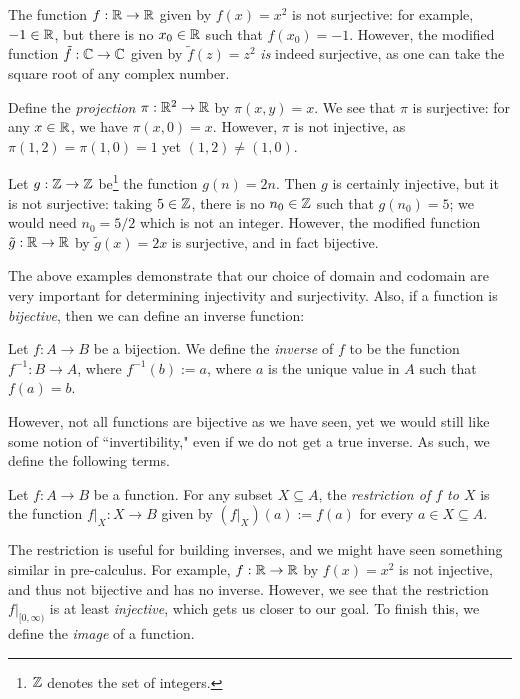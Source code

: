 \documentclass{article}
\begin{document}
\begin{example}
The function $f: \mathbb R\to \mathbb R$ given by $f(x) = x^2$ is not surjective: for example, $-1\in \mathbb R$, but there is no $x_0\in \mathbb R$ such that $f(x_0) = -1$. However, the modified function $\tilde f: \mathbb C\to \mathbb C$ given by $\tilde f(z) = z^2$ \textit{is} indeed surjective, as one can take the square root of any complex number.
\end{example}
\begin{example}
Define the \textit{projection} $\pi: \mathbb R^2\to \mathbb R$ by $\pi (x,y) = x$. We see that $\pi$ is surjective: for any $x\in \mathbb R$, we have $\pi(x, 0) = x$. However, $\pi$ is not injective, as $\pi(1, 2) = \pi(1, 0) = 1$ yet $(1,2) \neq (1,0)$.
\end{example}
\begin{example}
Let $g: \mathbb Z\to \mathbb Z$ be\footnote{$\mathbb Z$ denotes the set of integers.} the function $g(n) = 2n$. Then $g$ is certainly injective, but it is not surjective: taking $5\in \mathbb Z$, there is no $n_0\in \mathbb Z$ such that $g(n_0) = 5$; we would need $n_0 = 5/2$ which is not an integer. However, the modified function $\tilde g: \mathbb R\to \mathbb R$ by $\tilde g(x) = 2x$ is surjective, and in fact bijective.
\end{example}
The above examples demonstrate that our choice of domain and codomain are very important for determining injectivity and surjectivity. Also, if a function is \textit{bijective}, then we can define an inverse function:
\begin{definition}
Let $f: A\to B$ be a bijection. We define the \textit{inverse} of $f$ to be the function $f^{-1}: B\to A$, where $f^{-1}(b) := a$, where $a$ is the unique value in $A$ such that $f(a) = b$.
\end{definition}
However, not all functions are bijective as we have seen, yet we would still like some notion of ``invertibility," even if we do not get a true inverse. As such, we define the following terms.
\begin{definition}
Let $f:A\to B$ be a function. For any subset $X\subseteq A$, the \textit{restriction of $f$ to $X$} is the function $f|_X: X\to B$ given by $(f|_X)(a) := f(a)$ for every $a\in X\subseteq A$.
\end{definition}
The restriction is useful for building inverses, and we might have seen something similar in pre-calculus. For example, $f: \mathbb R\to \mathbb R$ by $f(x) = x^2$ is not injective, and thus not bijective and has no inverse. However, we see that the restriction $f|_{[0, \infty)}$ is at least \textit{injective}, which gets us closer to our goal. To finish this, we define the \textit{image} of a function.
\end{document}
